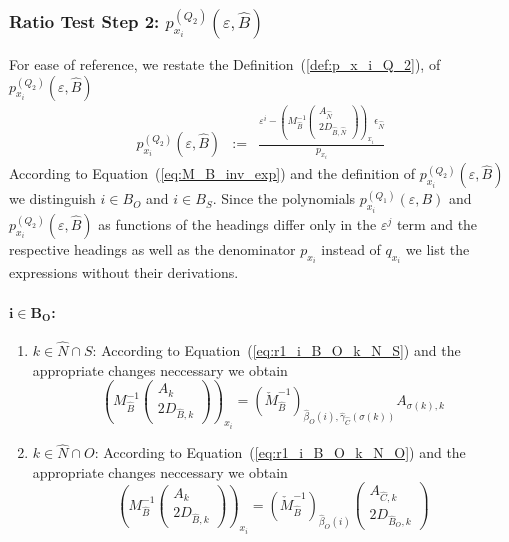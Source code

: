 \documentclass[a4paper]{article}
\begin{document}
\subsubsection{Ratio Test Step 2:
$p_{x_{i}}^{(Q_{2})}(\varepsilon, \hat{B})$}
For ease of reference, we restate the Definition~(\ref{def:p_x_i_Q_2}),
of $p_{x_{i}}^{(Q_{2})}(\varepsilon, \hat{B})$
\begin{eqnarray*}
p_{x_{i}}^{(Q_{2})}\left(\varepsilon, \hat{B}\right) &:=&
  \frac{\varepsilon^{i} -
         \left(M_{\hat{B}}^{-1}
           \left(\begin{array}{c}
                    A_{\hat{N}}  \\
	            \hline
	            2D_{\hat{B}, \hat{N}}
	         \end{array}
	   \right)
         \right)_{x_{i}}\epsilon_{\hat{N}}}{p_{x_{i}}}
\end{eqnarray*}
According to Equation~(\ref{eq:M_B_inv_exp}) and the definition of
$p_{x_{i}}^{(Q_{2})}(\varepsilon, \hat{B})$ we distinguish $i \in B_{O}$ and
$i \in B_{S}$. Since the polynomials
$p_{x_{i}}^{(Q_{1})}(\varepsilon, B)$ and
$p_{x_{i}}^{(Q_{2})}(\varepsilon, \hat{B})$ as functions of the headings
differ only in the $\varepsilon^{j}$ term and the respective headings
as well as the denominator $p_{x_{i}}$ instead of $q_{x_{i}}$
we list the expressions without their derivations.
  
\paragraph{$\mathbf{i \in B_{O}}$:}
\begin{enumerate}
\item $k \in \hat{N} \cap S$:
According to Equation~(\ref{eq:r1_i_B_O_k_N_S}) and the appropriate changes
neccessary we obtain
\begin{equation}
\label{eq:r2_i_B_O_k_N_S}
\left(
  M_{\hat{B}}^{-1}
  \left(\begin{array}{c}
          A_{k} \\
	  \hline
	  2D_{\hat{B}, k}
	\end{array}
  \right)
\right)_{x_{i}}
=
\left(\check{M}_{\hat{B}}^{-1}\right)_{\hat{\beta}_{O}(i),
\hat{\gamma}_{\hat{C}}(\sigma(k))}
A_{\sigma(k), k}
\end{equation}
\item $k \in \hat{N} \cap O$:
According to Equation~(\ref{eq:r1_i_B_O_k_N_O}) and the appropriate changes
neccessary we obtain
\begin{equation}
\label{eq:r2_i_B_O_k_N_O}
\left(
  M_{\hat{B}}^{-1}
  \left(\begin{array}{c}
          A_{k} \\
	  \hline
	  2D_{\hat{B}, k}
	\end{array}
  \right)
\right)_{x_{i}}
=
\left(\check{M}_{\hat{B}}^{-1}\right)_{\hat{\beta}_{O}(i)}
\left(\begin{array}{c}
        A_{\hat{C}, k} \\
	\hline
	2D_{\hat{B}_{O}, k}
      \end{array}
\right)
\end{equation}
\end{enumerate}
\end{document}

